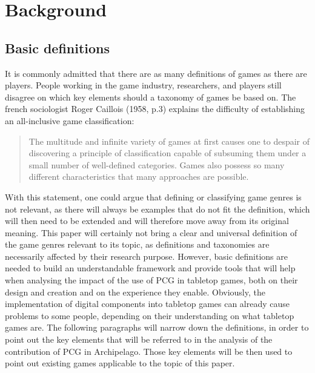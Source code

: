 \section{Background}
\subsection{Basic definitions}
It is commonly admitted that there are as many definitions of games as there are players. People working in the game industry, researchers, and players still disagree on which key elements should a taxonomy of games be based on. The french sociologist Roger Caillois (1958, p.3) explains the difficulty of establishing an all-inclusive game classification:
\begin{quotation}
The multitude and infinite variety of games at first causes one to despair of discovering a principle of classification capable of subsuming them under a small number of well-defined categories. Games also possess so many different characteristics that many approaches are possible.
\end{quotation} 
With this statement, one could argue that defining or classifying game genres is not relevant, as there will always be examples that do not fit the definition, which will then need to be extended and will therefore move away from its original meaning. This paper will certainly not bring a clear and universal definition of the game genres relevant to its topic, as definitions and taxonomies are necessarily affected by their research purpose. However, basic definitions are needed to build an understandable framework and provide tools that will help when analysing the impact of the use of PCG in tabletop games, both on their design and creation and on the experience they enable.
Obviously, the implementation of digital components into tabletop games can already cause problems to some people, depending on their understanding on what tabletop games are. The following paragraphs will narrow down the definitions, in order to point out the key elements that will be referred to in the analysis of the contribution of PCG in Archipelago. Those key elements will be then used to point out existing games applicable to the topic of this paper.

